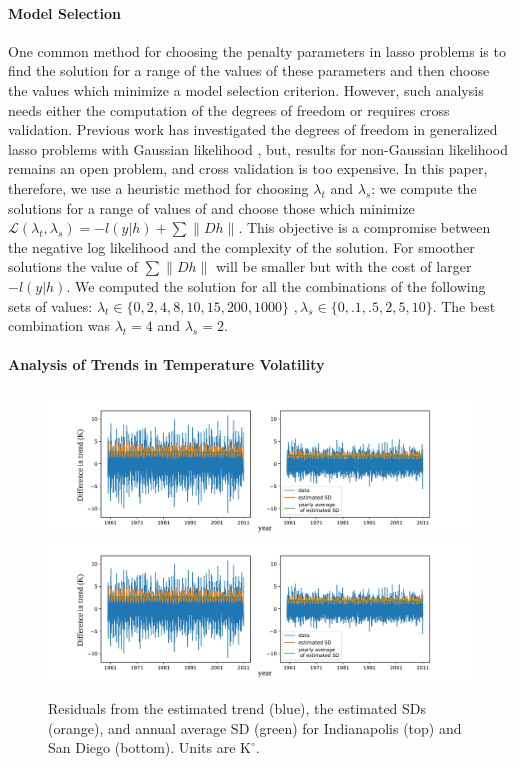 \documentclass[letterpaper]{article} %
\begin{document}
\paragraph{Model Selection}
One common method for choosing the penalty parameters in lasso
problems is to find the solution for a range of the values of these
parameters and then choose the values which minimize a model selection
criterion. However, such analysis needs either the computation of the degrees
of freedom or requires cross validation. Previous work has
investigated the degrees of freedom in 
generalized lasso problems with Gaussian likelihood
\cite{tibshirani_degrees_2012,hu_dual_2015,zeng_geometry_2017}, but,
results for non-Gaussian likelihood remains an open problem, and cross
validation is too expensive. 
In this paper, therefore, we use a heuristic method for choosing $\lambda_t$ and
$\lambda_s$: we compute the solutions for a range of values of
and choose those which minimize
$\mathscr{L}(\lambda_t,\lambda_s)=-l(y|h)+ \sum \lVert D h
\lVert$. This objective is a compromise between the negative log
likelihood and the complexity of the solution. For smoother solutions the value of $\sum
\lVert Dh \lVert$ will be smaller but with the cost of larger
$-l(y|h)$. We computed the solution for all the combinations of the
following sets of values: $\lambda_t \in \{0,2,4,8,10,15,200,1000\} \, \, ,
\lambda_s \in \{0,.1,.5,2,5,10\}$. The best combination was
$\lambda_t=4$ and $\lambda_s=2$. 


\paragraph{Analysis of Trends in Temperature Volatility}

\begin{figure}[tb]
  \centering
  \includegraphics[width=.66\columnwidth]{Figures/ts_estimatedVarLeft}
  \includegraphics[width=.66\columnwidth]{Figures/ts_estimatedVarRight}
  \caption{Residuals from the estimated trend
    (blue), the estimated SDs (orange), and annual average SD (green) for
   Indianapolis (top) and San Diego (bottom). Units are $\textrm{K}^{\circ}$.} 
  \label{fig:avg_change_estimatedSD}
\end{figure} 
\end{document}
